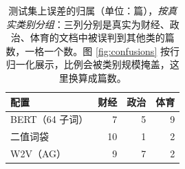 \begin{table}[t]
\centering
\footnotesize
\caption{测试集上误差的归属（单位：篇），\emph{按真实类别分组}：三列分别是真实为财经、政治、体育的文档中被误判到其他类的篇数，一格一个数。图 \ref{fig:confusions} 按行归一化展示，比例会被类别规模掩盖，这里换算成篇数。}
\label{tab:errors}
\begin{tabular}{lrrr}
\toprule
配置 & 财经 & 政治 & 体育 \\
\midrule
BERT（64 子词） & 7 & 5 & 9 \\
二值词袋 & 10 & 1 & 2 \\
W2V（AG） & 9 & 7 & 2 \\
\bottomrule
\end{tabular}
\end{table}
